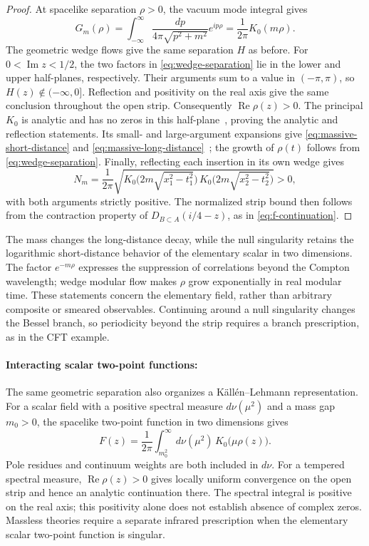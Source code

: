 \documentclass[a4paper,11pt]{article}
\theoremstyle{definition}
\begin{document}
\begin{proof}
At spacelike separation $\rho>0$, the vacuum mode integral gives
\[
 G_m(\rho)=\int_{-\infty}^\infty\frac{dp}{4\pi\sqrt{p^2+m^2}}e^{ip\rho}=\frac1{2\pi}K_0(m\rho).
\]
The geometric wedge flows give the same separation $H$ as before. For $0<\operatorname{Im}z<1/2$, the two factors in \eqref{eq:wedge-separation} lie in the lower and upper half-planes, respectively. Their arguments sum to a value in $(-\pi,\pi)$, so $H(z)\notin(-\infty,0]$. Reflection and positivity on the real axis give the same conclusion throughout the open strip. Consequently $\operatorname{Re}\rho(z)>0$. The principal $K_0$ is analytic and has no zeros in this half-plane~\cite[\S10.42]{DLMF}, proving the analytic and reflection statements. Its small- and large-argument expansions give \eqref{eq:massive-short-distance} and \eqref{eq:massive-long-distance}~\cite[\S10.31, \S10.40]{DLMF}; the growth of $\rho(t)$ follows from \eqref{eq:wedge-separation}. Finally, reflecting each insertion in its own wedge gives
\begin{equation}
 N_m=\frac1{2\pi}\sqrt{K_0\bigl(2m\sqrt{x_1^2-t_1^2}\bigr)\,K_0\bigl(2m\sqrt{x_2^2-t_2^2}\bigr)}>0 ,
 \label{eq:massive-normalization}
\end{equation}
with both arguments strictly positive. The normalized strip bound then follows from the contraction property of $D_{B\subset A}(i/4-z)$, as in \eqref{eq:f-continuation}.
\end{proof}

The mass changes the long-distance decay, while the null singularity retains the logarithmic short-distance behavior of the elementary scalar in two dimensions. The factor $e^{-m\rho}$ expresses the suppression of correlations beyond the Compton wavelength; wedge modular flow makes $\rho$ grow exponentially in real modular time. These statements concern the elementary field, rather than arbitrary composite or smeared observables. Continuing around a null singularity changes the Bessel branch, so periodicity beyond the strip requires a branch prescription, as in the CFT example.

\paragraph{Interacting scalar two-point functions:}
The same geometric separation also organizes a K\"all\'en--Lehmann representation. For a scalar field with a positive spectral measure $d\nu(\mu^2)$ and a mass gap $m_0>0$, the spacelike two-point function in two dimensions gives
\begin{equation}
 F(z)=\frac1{2\pi}\int_{m_0^2}^\infty d\nu(\mu^2)\,K_0\bigl(\mu\rho(z)\bigr).
 \label{eq:KL}
\end{equation}
Pole residues and continuum weights are both included in $d\nu$. For a tempered spectral measure, $\operatorname{Re}\rho(z)>0$ gives locally uniform convergence on the open strip and hence an analytic continuation there. The spectral integral is positive on the real axis; this positivity alone does not establish absence of complex zeros. Massless theories require a separate infrared prescription when the elementary scalar two-point function is singular.
\end{document}
